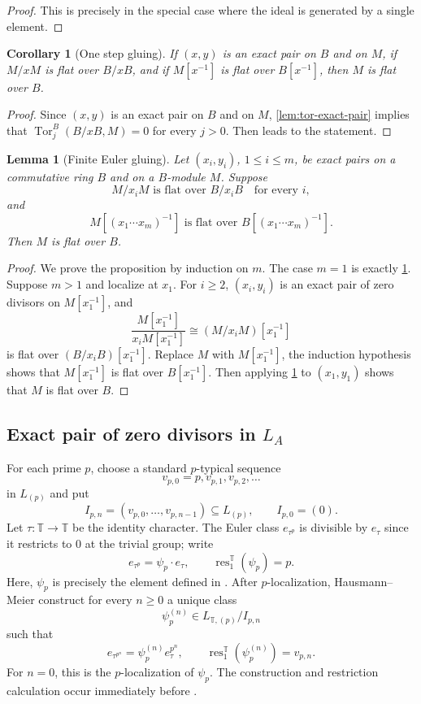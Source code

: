 \documentclass[11pt,reqno]{amsart}
\newtheorem{lemma}[lemma]{Lemma}
\newtheorem{corollary}[corollary]{Corollary}
\newcommand{\Tor}{\operatorname{Tor}}
\newcommand{\res}{\operatorname{res}}
\newcommand{\bbT}{\mathbb T}
\begin{document}
\begin{proof}
  This is precisely \cite[Lemma 10.99.17]{stacks-project} in the special case where the ideal is generated by a single element.
\end{proof}

\begin{corollary}[One step gluing]\label{cor:pair-gluing}
If $(x,y)$ is an exact pair on $B$ and on $M$, if $M/xM$ is flat over
$B/xB$, and if $M[x^{-1}]$ is flat over $B[x^{-1}]$, then $M$ is flat over
$B$.
\end{corollary}

\begin{proof}
Since $(x,y)$ is an exact pair on $B$ and on $M$, \cref{lem:tor-exact-pair} implies that $\Tor_j^B(B/xB,M)=0$ for every $j>0$. Then  leads to the statement.
\end{proof}

\begin{lemma}[Finite Euler gluing]\label{lem:finite-gluing}
Let $(x_i,y_i)$, $1\leq i\leq m$, be exact pairs on a commutative ring $B$ and
on a $B$-module $M$. Suppose
\[
 M/x_iM\text{ is flat over }B/x_iB
 \quad\text{for every }i,
\]
and
\[
 M[(x_1\cdots x_m)^{-1}]
 \text{ is flat over }B[(x_1\cdots x_m)^{-1}].
\]
Then $M$ is flat over $B$.
\end{lemma}
\begin{proof}
We prove the proposition by induction on $m$. The case $m=1$ is exactly
\cref{cor:pair-gluing}. Suppose $m>1$ and localize at $x_1$. For
$i\geq2$, $(x_i,y_i)$ is an exact pair of zero divisors on $M[x_1^{-1}]$, and
\[
 \frac{M[x_1^{-1}]}{x_iM[x_1^{-1}]}
 \cong (M/x_iM)[x_1^{-1}]
\]
is flat over $(B/x_iB)[x_1^{-1}]$. Replace $M$ with $M[x_1^{-1}]$, the induction hypothesis shows that $M[x_1^{-1}]$ is flat over $B[x_1^{-1}]$. Then applying \cref{cor:pair-gluing} to $(x_1,y_1)$ shows that $M$ is flat over $B$.
\end{proof}


\subsection{Exact pair of zero divisors in $L_A$}
For each prime $p$, choose a standard $p$-typical sequence
\[
  v_{p,0}=p,v_{p,1},v_{p,2},\ldots
\]
in $L_{(p)}$ and put
\[
 I_{p,n}=(v_{p,0},\ldots,v_{p,n-1})\subseteq L_{(p)},
 \qquad I_{p,0}=(0).
\]
Let $\tau:\bbT\to\bbT$ be the identity character.  The Euler
class $e_{\tau^p}$ is divisible by $e_\tau$ since it restricts to $0$ at the trivial group; write
\[
  e_{\tau^p}=\psi_p \cdot e_\tau, \qquad \res_1^{\bbT}(\psi_p)=p.
\]
Here, $\psi_p$ is precisely the element defined in \cite[Proposition 5.46]{hausmann2022global}.
After $p$-localization, Hausmann--Meier construct for every $n\geq0$ a unique
class
\[
 \psi_p^{(n)}\in L_{\bbT,(p)}/I_{p,n}
\]
such that
\[
  e_{\tau^{p^n}}=\psi_p^{(n)}e_\tau^{p^n},  \qquad  \res_1^{\bbT}(\psi_p^{(n)})=v_{p,n}.
\]
For $n=0$, this is the $p$-localization of $\psi_p$\cite[Remark 5.13]{hausmann2023invariant}.  The construction and restriction calculation occur immediately before \cite[Proposition 5.10]{hausmann2023invariant}.
\end{document}
